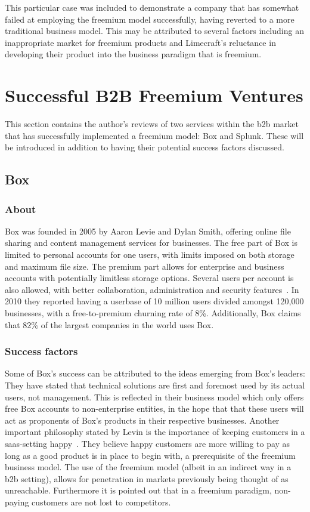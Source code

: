 This particular case was included to demonstrate a company that has somewhat failed at employing the freemium model successfully, having reverted to a more traditional business model. This may be attributed to several factors including an inappropriate market for freemium products and Limecraft's reluctance in developing their product into the business paradigm that is freemium. 
\newpage
\section{Successful B2B Freemium Ventures}
This section contains the author's reviews of two services within the \gls{b2b} market that has successfully implemented a freemium model: Box and Splunk. These will be introduced in addition to having their potential success factors discussed.
\subsection{Box}
\subsubsection{About}
Box was founded in 2005 by Aaron Levie and Dylan Smith, offering online file sharing and content management services for businesses. The free part of Box is limited to personal accounts for one users, with limits imposed on both storage and maximum file size. The premium part allows for enterprise and business accounts with potentially limitless storage options. Several users per account is also allowed, with better collaboration, administration and security features~\cite{freemium.orgN/A}. In 2010 they reported having a userbase of 10 million users divided amongst 120,000 businesses, with a free-to-premium churning rate of 8\%. Additionally, Box claims that 82\% of the largest companies in the world uses Box.
\subsubsection{Success factors}
Some of Box's success can be attributed to the ideas emerging from Box's leaders: They have stated that technical solutions are first and foremost used by its actual users, not management. This is reflected in their business model which only offers free Box accounts to non-enterprise entities, in the hope that that these users will act as proponents of Box's products in their respective businesses. Another important philosophy stated by Levin is the importance of keeping customers in a \gls{saas}-setting happy~\cite{tientzuozuora2014}\cite{youtube2011}. They believe happy customers are more willing to pay as long as a good product is in place to begin with, a prerequisite of the freemium business model. The use of the freemium model (albeit in an indirect way in a \gls{b2b} setting), allows for penetration in markets previously being thought of as unreachable. Furthermore it is pointed out that in a freemium paradigm, non-paying customers are not lost to competitors.


